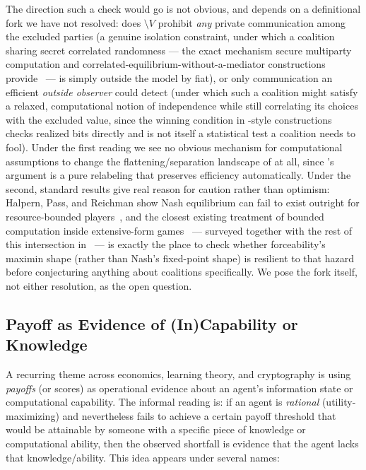 The direction such a check would go is not obvious, and depends on a
definitional fork we have not resolved: does $\setminus V$ prohibit
\emph{any} private communication among the excluded parties (a genuine
isolation constraint, under which a coalition sharing secret correlated
randomness --- the exact mechanism secure multiparty computation and
correlated-equilibrium-without-a-mediator constructions
provide~\cite{DodisHaleviRabin2000Cryptographic} --- is simply outside the
model by fiat), or only communication an efficient \emph{outside observer}
could detect (under which such a coalition might satisfy a relaxed,
computational notion of independence while still correlating its choices
with the excluded value, since the winning condition in
-style constructions checks realized
bits directly and is not itself a statistical test a coalition needs to
fool). Under the first reading we see no obvious mechanism for computational
assumptions to change the flattening/separation landscape of
 at all, since 's
argument is a pure relabeling that preserves efficiency automatically. Under
the second, standard results give real reason for caution rather than
optimism: Halpern, Pass, and Reichman show Nash equilibrium can fail to
exist outright for resource-bounded
players~\cite{HalpernPassReichman2015NonExistence}, and the closest existing
treatment of bounded computation inside extensive-form
games~\cite{HalpernPass2015AlgorithmicRationality,HalpernPassSeeman2016ComputationalEFG}
--- surveyed together with the rest of this intersection
in~\cite{Katz2008Bridging} --- is exactly the place to check whether
forceability's maximin shape (rather than Nash's fixed-point shape) is
resilient to that hazard before conjecturing anything about coalitions
specifically. We pose the fork itself, not either resolution, as the open
question.

\subsection{Payoff as Evidence of (In)Capability or Knowledge}
\label{subsec:payoff-ignorance}

A recurring theme across economics, learning theory, and cryptography is using
\emph{payoffs} (or scores) as operational evidence about an agent’s information
state or computational capability. The informal reading is: if an agent is
\emph{rational} (utility-maximizing) and nevertheless fails to achieve a certain
payoff threshold that would be attainable by someone with a specific piece of
knowledge or computational ability, then the observed shortfall is evidence that
the agent lacks that knowledge/ability. This idea appears under several names:

